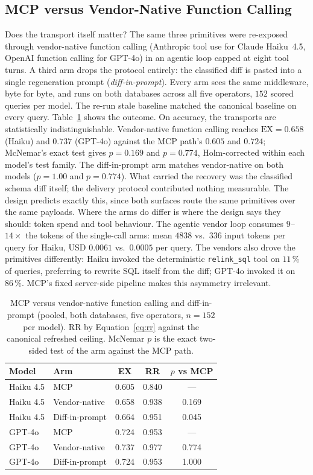\documentclass[conference,10pt,a4paper]{IEEEtran}
\begin{document}
\subsection{MCP versus Vendor-Native Function Calling}
\label{sec:vendor}
Does the transport itself matter? The same three primitives were
re-exposed through vendor-native function calling
(Anthropic tool use for Claude Haiku~4.5, OpenAI function calling for
GPT-4o) in an agentic loop capped at eight tool turns. A third arm drops the
protocol entirely: the classified diff is pasted into a single
regeneration prompt (\emph{diff-in-prompt}). Every arm sees the same
middleware, byte for byte, and runs on both databases across all five
operators, $152$ scored queries per model. The re-run stale baseline matched the canonical baseline on every
query. Table~\ref{tab:vendor} shows the outcome. On
accuracy, the transports are statistically indistinguishable. Vendor-native
function calling reaches $\text{EX} = 0.658$ (Haiku) and $0.737$
(GPT-4o) against the MCP path's $0.605$ and $0.724$; McNemar's exact
test gives $p = 0.169$ and $p = 0.774$, Holm-corrected within each
model's test family. The diff-in-prompt arm matches vendor-native on
both models ($p = 1.00$ and $p = 0.774$). What carried the recovery was the classified schema diff itself; the
delivery protocol contributed nothing measurable. The design predicts
exactly this, since both surfaces route the same primitives over the
same payloads. Where the arms do differ is where the design says they
should: token spend and tool behaviour. The agentic vendor loop consumes
$9$--$14\times$ the tokens of the single-call arms: mean $4838$ vs.\
$336$ input tokens per query for Haiku, USD $0.0061$ vs.\ $0.0005$ per
query. The vendors also drove the primitives differently: Haiku invoked the
deterministic \texttt{relink\_sql} tool on $11\,\%$ of queries,
preferring to rewrite SQL itself from the diff; GPT-4o invoked it on
$86\,\%$. MCP's fixed server-side pipeline makes this asymmetry
irrelevant.

\begin{table}[t]
\centering
\footnotesize
\caption{MCP versus vendor-native function calling and diff-in-prompt
(pooled, both databases, five operators, $n=152$ per model). RR by
Equation~\ref{eq:rr} against the canonical refreshed ceiling. McNemar
$p$ is the exact two-sided test of the arm against the MCP path.}
\label{tab:vendor}
\begin{tabular}{llccc}
\toprule
\textbf{Model} & \textbf{Arm} & \textbf{EX} & \textbf{RR} & $p$ \textbf{vs MCP} \\
\midrule
Haiku 4.5 & MCP            & 0.605 & 0.840 & --- \\
Haiku 4.5 & Vendor-native  & 0.658 & 0.938 & 0.169 \\
Haiku 4.5 & Diff-in-prompt & 0.664 & 0.951 & 0.045 \\
GPT-4o    & MCP            & 0.724 & 0.953 & --- \\
GPT-4o    & Vendor-native  & 0.737 & 0.977 & 0.774 \\
GPT-4o    & Diff-in-prompt & 0.724 & 0.953 & 1.000 \\
\bottomrule
\end{tabular}
\end{table}
\end{document}
